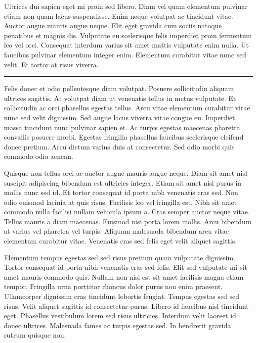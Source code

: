 \documentclass[10pt]{article}
\newenvironment{BoxedInternal}[1][]
{%
  \begin{changemargin}{0cm}{0cm}%
    \begin{mdframed}[roundcorner=5pt,backgroundcolor=swred,outermargin  =-0.5in,innermargin =-0.5in, topline=false, bottomline=false, rightline=false, leftline=false,#1]
    }{%
    \end{mdframed}%
  \end{changemargin}%
}
\newcommand*{\noind}{\setlength{\parindent}{0cm}} %
\newcommand{\bighdr}[2][]{%
\vspace{2pt}
  \begin{BoxedInternal}[#1]{}
    \color{white}\huge\bfseries\headingfont\filcenter{#2}
  \end{BoxedInternal}\vspace{-8pt}%
}
\newcommand{\medhdr}[1][]{%
	{\noind{\Large\bfseries\headingfont{#1}}}
	\vspace{-9pt}

	\noindent\rule{2.75in}{2pt} %
}
\begin{document}
\begin{multicols}{2}
Ultrices dui sapien eget mi proin sed libero. Diam vel quam elementum pulvinar etiam non quam lacus suspendisse. Enim neque volutpat ac tincidunt vitae. Auctor augue mauris augue neque. Elit eget gravida cum sociis natoque penatibus et magnis dis. Vulputate eu scelerisque felis imperdiet proin fermentum leo vel orci. Consequat interdum varius sit amet mattis vulputate enim nulla. Ut faucibus pulvinar elementum integer enim. Elementum curabitur vitae nunc sed velit. Et tortor at risus viverra.\\

\medhdr[ANOTHER SMALL SECTION]
{\noind
Felis donec et odio pellentesque diam volutpat. Posuere sollicitudin aliquam ultrices sagittis. At volutpat diam ut venenatis tellus in metus vulputate. Et sollicitudin ac orci phasellus egestas tellus. Arcu vitae elementum curabitur vitae nunc sed velit dignissim. Sed augue lacus viverra vitae congue eu. Imperdiet massa tincidunt nunc pulvinar sapien et. Ac turpis egestas maecenas pharetra convallis posuere morbi. Egestas fringilla phasellus faucibus scelerisque eleifend donec pretium. Arcu dictum varius duis at consectetur. Sed odio morbi quis commodo odio aenean.
}

Quisque non tellus orci ac auctor augue mauris augue neque. Diam sit amet nisl suscipit adipiscing bibendum est ultricies integer. Etiam sit amet nisl purus in mollis nunc sed id. Et tortor consequat id porta nibh venenatis cras sed. Non odio euismod lacinia at quis risus. Facilisis leo vel fringilla est. Nibh sit amet commodo nulla facilisi nullam vehicula ipsum a. Cras semper auctor neque vitae. Tellus mauris a diam maecenas. Euismod nisi porta lorem mollis. Arcu bibendum at varius vel pharetra vel turpis. Aliquam malesuada bibendum arcu vitae elementum curabitur vitae. Venenatis cras sed felis eget velit aliquet sagittis.

\bighdr{OTHER STUFF}
{\noind
Elementum tempus egestas sed sed risus pretium quam vulputate dignissim. Tortor consequat id porta nibh venenatis cras sed felis. Elit sed vulputate mi sit amet mauris commodo quis. Nullam non nisi est sit amet facilisis magna etiam tempor. Fringilla urna porttitor rhoncus dolor purus non enim praesent. Ullamcorper dignissim cras tincidunt lobortis feugiat. Tempus egestas sed sed risus. Velit aliquet sagittis id consectetur purus. Libero id faucibus nisl tincidunt eget. Phasellus vestibulum lorem sed risus ultricies. Interdum velit laoreet id donec ultrices. Malesuada fames ac turpis egestas sed. In hendrerit gravida rutrum quisque non.
}


\end{multicols}
\end{document}
